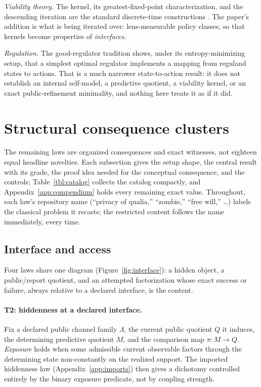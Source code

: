 \documentclass[11pt]{article}
\theoremstyle{definition}
\begin{document}
\emph{Viability theory.} The kernel, its greatest-fixed-point
characterization, and the descending iteration are the standard discrete-time
constructions \citep{AnayaEtAl2009Viability, AubinBayenSaintPierre2011}. The
paper's addition is what is being iterated over: lens-measurable policy
classes, so that kernels become properties of \emph{interfaces}.

\emph{Regulation.} The good-regulator tradition
\citep{ConantAshby1970} shows, under its entropy-minimizing setup, that a
simplest optimal regulator implements a mapping from reguland states to
actions. That is a much narrower state-to-action result: it does not
establish an internal self-model, a predictive quotient, a viability kernel,
or an exact public-refinement minimality, and nothing here treats it as if it
did.

 \section{Structural consequence clusters}
\label{sec:clusters}


The remaining laws are organized consequences and exact witnesses, not
eighteen equal headline novelties. Each subsection gives the setup shape, the
central result with its grade, the proof idea needed for the conceptual
consequence, and the controls; Table~\ref{tbl:catalog} collects the catalog
compactly, and Appendix~\ref{app:compendium} holds every remaining exact
value. Throughout, each law's repository name (``privacy of qualia,''
``zombie,'' ``free will,'' \dots) labels the classical problem it recasts; the
restricted content follows the name immediately, every time.

\subsection{Interface and access}
\label{sec:interface}


Four laws share one diagram (Figure~\ref{fig:interface}): a hidden object, a
public/report quotient, and an attempted factorization whose exact success or
failure, always relative to a declared interface, is the content.

\paragraph{T2: hiddenness at a declared interface.}
Fix a declared public channel family $\Lambda$, the current public quotient
$Q$ it induces, the determining predictive quotient $M$, and the comparison
map $\pi : M \to Q$. \emph{Exposure} holds when some admissible current
observable factors through the determining state non-constantly on the
realized support. The imported hiddenness law (Appendix~\ref{app:imports})
then gives a dichotomy controlled entirely by the binary exposure predicate,
not by coupling strength.
\end{document}
